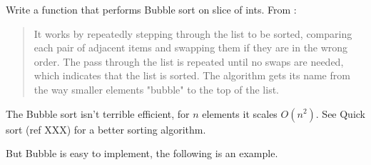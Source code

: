 \begin{Exercise}[title={Bubble sort},difficulty=5]
\label{ex:bubble}
\Question\label{ex:bubble q1} Write a function that performs 
Bubble sort on slice of ints. From \cite{bubblesort}:
\begin{quote}
It works by repeatedly stepping through the list to be sorted, comparing each
pair of adjacent items and swapping them if they are in the wrong order. The
pass through the list is repeated until no swaps are needed, which indicates
that the list is sorted. The algorithm gets its name from the way smaller
elements "bubble" to the top of the list. 
\end{quote}

\end{Exercise}

\begin{Answer}
\Question 
The Bubble sort isn't terrible efficient, for $n$ elements it scales
$O(n^2)$. See Quick sort (ref XXX) for a better sorting algorithm.

But Bubble is easy to implement, the following is an example.


\end{Answer}
